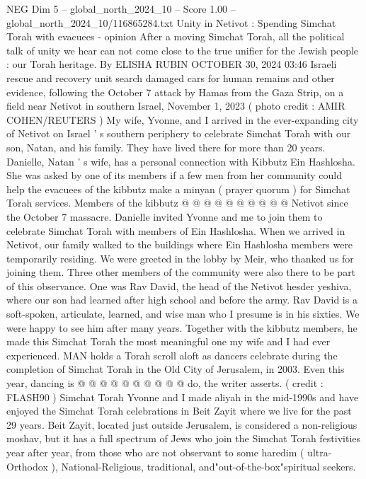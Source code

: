 \begin{textsample}{NEG Dim 5 – global\_north\_2024\_10 – Score 1.00 – global\_north\_2024\_10/116865284.txt}  \label{ex:f5_neg_048}
Unity in Netivot : Spending Simchat Torah with evacuees - opinion After a moving Simchat Torah, all the political talk of unity we hear can not come close to the true unifier for the Jewish people : our Torah heritage.
By ELISHA RUBIN OCTOBER 30, 2024 03:46 Israeli rescue and recovery unit search damaged cars for human remains and other evidence, following the October 7 attack by Hamas from the Gaza Strip, on a field near Netivot in southern Israel, November 1, 2023 ( photo credit : AMIR COHEN/REUTERS ) My wife, Yvonne, and I arrived in the ever-expanding city of Netivot on Israel ' s southern periphery to celebrate Simchat Torah with our son, Natan, and his family.
They have lived there for more than 20 years.
Danielle, Natan ' s wife, has a personal connection with Kibbutz Ein Hashlosha.
She was asked by one of its members if a few men from her community could help the evacuees of the kibbutz make a minyan ( prayer quorum ) for Simchat Torah services.
Members of the kibbutz @ @ @ @ @ @ @ @ @ @ Netivot since the October 7 massacre.
Danielle invited Yvonne and me to join them to celebrate Simchat Torah with members of Ein Hashlosha.
When we arrived in Netivot, our family walked to the buildings where Ein Hashlosha members were temporarily residing.
We were greeted in the lobby by Meir, who thanked us for joining them.
Three other members of the community were also there to be part of this observance.
One was Rav David, the head of the Netivot hesder yeshiva, where our son had learned after high school and before the army.
Rav David is a soft-spoken, articulate, learned, and wise man who I presume is in his sixties.
We were happy to see him after many years.
Together with the kibbutz members, he made this Simchat Torah the most meaningful one my wife and I had ever experienced.
MAN holds a Torah scroll aloft as dancers celebrate during the completion of Simchat Torah in the Old City of Jerusalem, in 2003.
Even this year, dancing is @ @ @ @ @ @ @ @ @ @ do, the writer asserts. ( credit : FLASH90 ) Simchat Torah Yvonne and I made aliyah in the mid-1990s and have enjoyed the Simchat Torah celebrations in Beit Zayit where we live for the past 29 years.
Beit Zayit, located just outside Jerusalem, is considered a non-religious moshav, but it has a full spectrum of Jews who join the Simchat Torah festivities year after year, from those who are not observant to some haredim ( ultra-Orthodox ), National-Religious, traditional, and"out-of-the-box"spiritual seekers.

\end{textsample}
